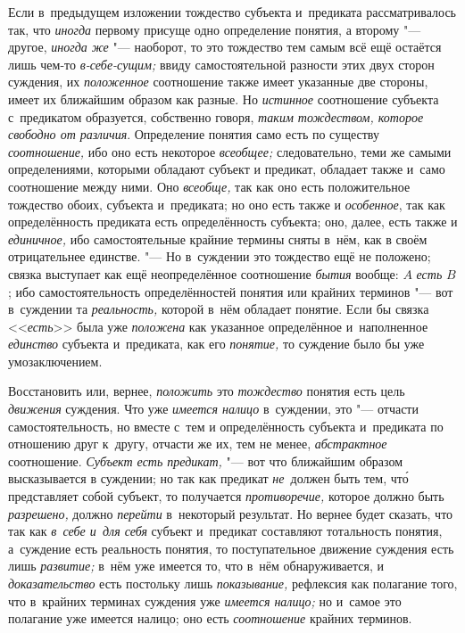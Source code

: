 Если в~предыдущем изложении тождество субъекта и~предиката рассматривалось так,
что {\em иногда} первому присуще одно определение понятия,
а второму "--- другое, {\em иногда же} "--- наоборот, то это тождество тем
самым всё ещё остаётся лишь чем-то {\em в-себе-сущим;} ввиду самостоятельной
разности этих двух сторон суждения, их {\em положенное} соотношение также имеет
указанные две стороны, имеет их ближайшим образом как разные. Но {\em истинное}
соотношение субъекта с~предикатом образуется, собственно говоря,
{\em таким тождеством, которое свободно от различия}. Определение понятия само
есть по существу {\em соотношение,} ибо оно есть некоторое {\em всеобщее;}
следовательно, теми же самыми определениями, которыми обладают субъект и
предикат, обладает также и~само соотношение между ними. Оно {\em всеобще,}
так как оно есть положительное тождество обоих, субъекта и~предиката; но оно
есть также и {\em особенное},
так как определённость предиката есть определённость субъекта; оно, далее, есть
также и {\em единичное,} ибо самостоятельные крайние термины сняты в~нём, как
в своём отрицательнее единстве. "--- Но в~суждении это тождество ещё не
положено; связка выступает как ещё неопределённое соотношение {\em бытия}
вообще: $A$ {\em есть} $B$; ибо самостоятельность определённостей понятия или
крайних терминов "--- вот в~суждении та {\em реальность,} которой в~нём
обладает понятие. Если бы связка <<{\em есть}>> была уже {\em положена} как
указанное определённое и~наполненное {\em единство} субъекта и~предиката, как
его {\em понятие,} то суждение было бы уже умозаключением.

Восстановить или, вернее, {\em положить} это {\em тождество} понятия есть цель
{\em движения} суждения. Что уже {\em имеется налицо} в~суждении,
это "--- отчасти самостоятельность, но вместе с~тем и
определённость субъекта и~предиката по отношению друг к~другу, отчасти же
их, тем не менее, {\em абстрактное} соотношение.
{\em Субъект есть предикат,} "--- вот что ближайшим образом высказывается в
суждении; но так как предикат {\em не}~должен быть тем, чт\'{о}
представляет собой субъект, то получается {\em противоречие,} которое должно
быть {\em разрешено,} должно {\em перейти} в~некоторый результат. Но вернее
будет сказать, что так как {\em в~себе и~для себя} субъект и~предикат
составляют тотальность понятия, а~суждение есть реальность понятия, то
поступательное движение суждения есть лишь {\em развитие;} в~нём уже
имеется то, что в~нём обнаруживается, и {\em доказательство} есть
постольку лишь {\em показывание,} рефлексия как полагание того, что в~крайних
терминах суждения уже {\em имеется налицо;} но и~самое это полагание уже
имеется налицо; оно есть {\em соотношение} крайних терминов.


